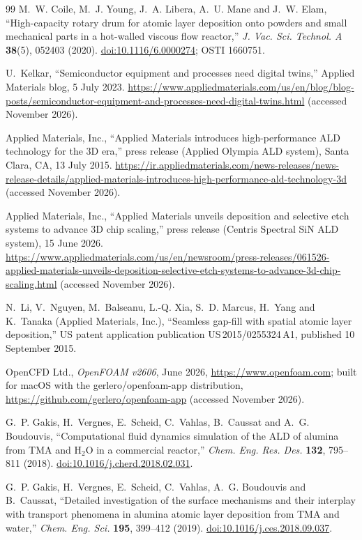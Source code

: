 \documentclass[11pt,letterpaper]{article}
\begin{document}
\begin{thebibliography}{99}
M.~W. Coile, M.~J. Young, J.~A. Libera, A.~U. Mane and J.~W. Elam,
``High-capacity rotary drum for atomic layer deposition onto powders and small mechanical parts in a hot-walled viscous flow reactor,''
\emph{J. Vac. Sci. Technol. A} \textbf{38}(5), 052403 (2020).
\href{https://doi.org/10.1116/6.0000274}{doi:10.1116/6.0000274}; OSTI 1660751.

U.~Kelkar, ``Semiconductor equipment and processes need digital twins,'' Applied Materials blog, 5 July 2023.
\url{https://www.appliedmaterials.com/us/en/blog/blog-posts/semiconductor-equipment-and-processes-need-digital-twins.html} (accessed November 2026).

Applied Materials, Inc., ``Applied Materials introduces high-performance ALD technology for the 3D era,'' press release (Applied Olympia ALD system), Santa Clara, CA, 13 July 2015.
\url{https://ir.appliedmaterials.com/news-releases/news-release-details/applied-materials-introduces-high-performance-ald-technology-3d} (accessed November 2026).

Applied Materials, Inc., ``Applied Materials unveils deposition and selective etch systems to advance 3D chip scaling,'' press release (Centris Spectral SiN ALD system), 15 June 2026.
\url{https://www.appliedmaterials.com/us/en/newsroom/press-releases/061526-applied-materials-unveils-deposition-selective-etch-systems-to-advance-3d-chip-scaling.html} (accessed November 2026).

N.~Li, V.~Nguyen, M.~Balseanu, L.-Q. Xia, S.~D. Marcus, H.~Yang and K.~Tanaka (Applied Materials, Inc.),
``Seamless gap-fill with spatial atomic layer deposition,'' US patent application publication US\,2015/0255324\,A1, published 10 September 2015.

OpenCFD Ltd., \emph{OpenFOAM v2606}, June 2026, \url{https://www.openfoam.com}; built for macOS with the gerlero/openfoam-app distribution, \url{https://github.com/gerlero/openfoam-app} (accessed November 2026).

G.~P. Gakis, H.~Vergnes, E.~Scheid, C.~Vahlas, B.~Caussat and A.~G. Boudouvis,
``Computational fluid dynamics simulation of the ALD of alumina from TMA and H$_2$O in a commercial reactor,''
\emph{Chem. Eng. Res. Des.} \textbf{132}, 795--811 (2018).
\href{https://doi.org/10.1016/j.cherd.2018.02.031}{doi:10.1016/j.cherd.2018.02.031}.

G.~P. Gakis, H.~Vergnes, E.~Scheid, C.~Vahlas, A.~G. Boudouvis and B.~Caussat,
``Detailed investigation of the surface mechanisms and their interplay with transport phenomena in alumina atomic layer deposition from TMA and water,''
\emph{Chem. Eng. Sci.} \textbf{195}, 399--412 (2019).
\href{https://doi.org/10.1016/j.ces.2018.09.037}{doi:10.1016/j.ces.2018.09.037}.


\end{thebibliography}
\end{document}
